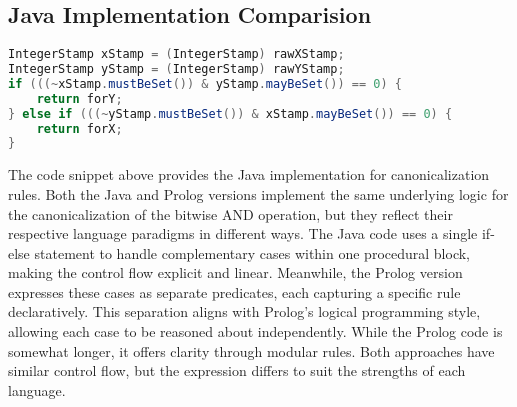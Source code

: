 \subsection*{Java Implementation Comparision}
\begin{lstlisting}[language=Java]
IntegerStamp xStamp = (IntegerStamp) rawXStamp;
IntegerStamp yStamp = (IntegerStamp) rawYStamp;
if (((~xStamp.mustBeSet()) & yStamp.mayBeSet()) == 0) {
    return forY;
} else if (((~yStamp.mustBeSet()) & xStamp.mayBeSet()) == 0) {
    return forX;
}
\end{lstlisting}
The code snippet above provides the Java implementation for canonicalization rules.
Both the Java and Prolog versions implement the same underlying logic for the canonicalization of the bitwise AND operation, but they reflect their respective language paradigms in different ways. The Java code uses a single if-else statement to handle complementary cases within one procedural block, making the control flow explicit and linear. Meanwhile, the Prolog version expresses these cases as separate predicates, each capturing a specific rule declaratively. This separation aligns with Prolog’s logical programming style, allowing each case to be reasoned about independently. While the Prolog code is somewhat longer, it offers clarity through modular rules. Both approaches have similar control flow, but the expression differs to suit the strengths of each language.
